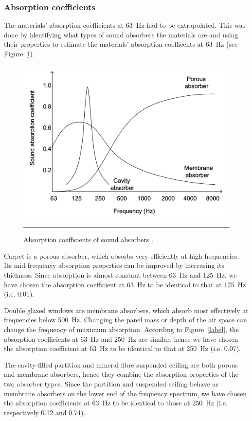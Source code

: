 \subsubsection{Absorption coefficients}

The materials' absorption coefficients at 63~Hz had to be extrapolated.
This was done by identifying what types of sound absorbers the materials are and using their properties to estimate the materials' absorption coefficents at 63~Hz (see Figure~\ref{fig:absorbers}).


\begin{figure}[htbp]
	\centering
	\includegraphics[width=.6\textwidth]{figures/Absorbers.png}
	\rule{.8\textwidth}{0.5pt} %
	\caption{Absorption coefficients of sound absorbers \citep{Galbrun2018}.}
	\label{fig:absorbers}
\end{figure}


Carpet is a porous absorber, which absorbs very efficiently at high frequencies.
Its mid-frequency absorption properties can be improved by increasing its thickness.
Since absorption is almost constant between 63~Hz and 125~Hz, we have chosen the absorption coefficient at 63~Hz to be identical to that at 125~Hz (i.e. 0.01).

Double glazed windows are membrane absorbers, which absorb most effectively at frequencies below 500~Hz.
Changing the panel mass or depth of the air space can change the frequency of maximum absorption.
According to Figure~\ref{label}, the absorption coefficients at 63~Hz and 250~Hz are similar, hence we have chosen the absorption coefficient at 63~Hz to be identical to that at 250~Hz (i.e. 0.07).

The cavity-filled partition and mineral fibre suspended ceiling are both porous and membrane absorbers, hence they combine the absorption properties of the two absorber types.
Since the partition and suspended ceiling behave as membrane absorbers on the lower end of the frequency spectrum, we have chosen the absorption coefficients at 63~Hz to be identical to those at 250~Hz (i.e. respectively 0.12 and 0.74).

